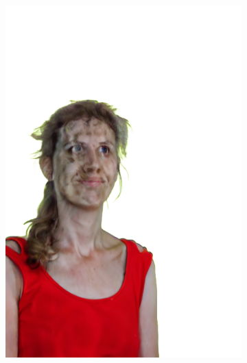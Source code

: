 \begin{figure}[ht]
    \centering
	\begin{subfigure}{0.08\linewidth}%
        \includegraphics[width=\textwidth]{Figures/results/low/dora_rabbit/11_render.png}

\end{subfigure}
\end{figure}
